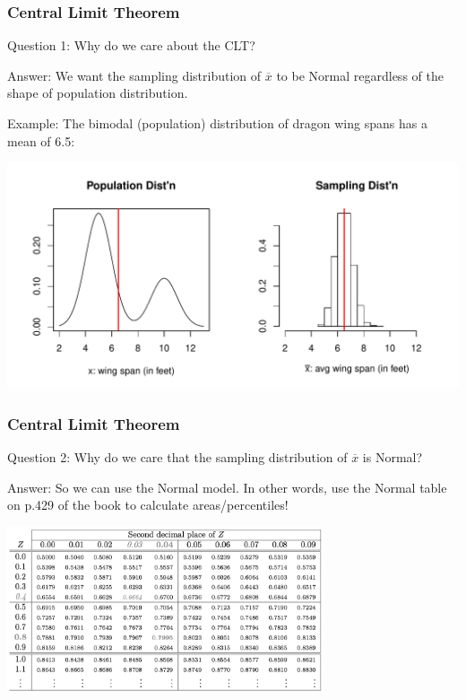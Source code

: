 \documentclass[handout]{beamer}
\newcommand{\blue}[1]{\textcolor{blue2}{#1}}
\newcommand{\xbar}{\overline{x}}
\begin{document}
\begin{frame}
\frametitle{Central Limit Theorem}
\blue{Question 1}:  Why do we care about the CLT?

\vspace{0.25cm}

\blue{Answer}:  We want the sampling distribution of $\xbar$ to be Normal \blue{regardless} of the shape of population distribution.

\vspace{0.25cm}

\blue{Example}:  The bimodal (population) distribution of dragon wing spans has a mean of 6.5:

\begin{center}
\includegraphics[width=\textwidth]{figure/CLT2.pdf}
\end{center}

\end{frame}


\begin{frame}
\frametitle{Central Limit Theorem}
\blue{Question 2}:  Why do we care that the sampling distribution of $\xbar$ is Normal?

\vspace{0.25cm}

\pause\blue{Answer}:  So we can use the \blue{Normal model}.  In other words, use the Normal table on p.429 of the book to calculate areas/percentiles!

\vspace{0.25cm}

\begin{center}
\includegraphics[width=0.7\textwidth]{figure/normal_table.png}
\end{center}


\end{frame}
\end{document}

